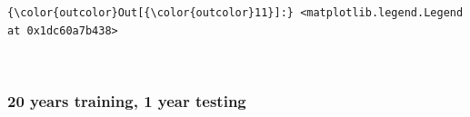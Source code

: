 \documentclass[11pt]{article}
\begin{document}
\begin{Verbatim}[commandchars=\\\{\}]
{\color{outcolor}Out[{\color{outcolor}11}]:} <matplotlib.legend.Legend at 0x1dc60a7b438>
\end{Verbatim}
            
    \begin{center}
    \end{center}
    { \hspace*{\fill} \\}
    
    \hypertarget{years-training-1-year-testing}{%
\subsubsection{20 years training, 1 year
testing}\label{years-training-1-year-testing}}
\end{document}

